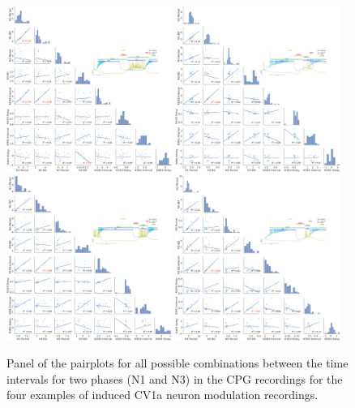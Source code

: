 \begin{figure}[htbp]
	\centering
	\includegraphics[width=0.48\textwidth]{./img/invariants/data/SUSSEX/CV1a_driven1/images/2phases/panel_with_pairplot.png}
	\includegraphics[width=0.48\textwidth]{./img/invariants/data/SUSSEX/CV1a_driven2/images/panel_with_pairplot.png}
	\includegraphics[width=0.48\textwidth]{./img/invariants/data/SUSSEX/CV1a_driven4/images/2phases/panel_with_pairplot.png}
	\includegraphics[width=0.48\textwidth]{./img/invariants/data/SUSSEX/CV1a_driven3/images/panel_with_pairplot.png}
	\caption{Panel of the pairplots for all possible combinations between the time intervals for two phases (N1 and N3) in the CPG recordings for the four examples of induced CV1a neuron modulation recordings.}
	\label{fig:cv1a pairplot comparison}
\end{figure}

